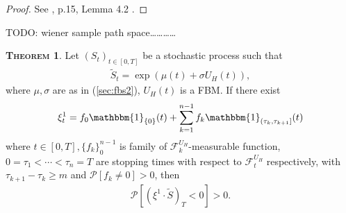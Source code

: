 \documentclass[a4paper, twoside, 11pt]{article}
\theoremstyle{definition}
\newtheorem{theorem}[definition]{\scshape Theorem}
\newcommand{\brkt}[1]{\left({#1} \right)}
\begin{document}
\begin{proof}
  See \cite{chridito}, p.15, Lemma 4.2 .
\end{proof}
TODO: wiener sample path space\dots\dots\dots\dots
\begin{theorem}
  Let $(S_t)_{t\in[0, T]}$ be a stochastic process such that
  \begin{eqnarray}
	\tilde{S}_t = \exp\brkt{\mu(t) + \sigma U_H(t)},
	\label{sec:fbs}
  \end{eqnarray}
  where $\mu, \sigma$ are as in (\ref{sec:fbs2}), $U_H(t)$ is a FBM. If there exist
  \begin{eqnarray*}
  \xi^1_t = f_0\mathbbm{1}_{\{0\}}(t)+\sum_{k=1}^{n-1} f_k \mathbbm{1}_{(\tau_k, \tau_{k+1}]}(t)
  \end{eqnarray*}
  where $t\in[0, T], \{f_k\}_0^{n-1}$ is family of  $\mathcal{F}^{U_H}_k $-measurable function, $0 = \tau_1 < \cdots <\tau_n = T$ are stopping times with respect to $\mathcal{F}^{U_H}_t $ respectively,  with $\tau_{k+1} - \tau_k\ge m$ and $\mathcal{P}[f_k\neq 0]>0$, then
  \begin{eqnarray*}
	\mathcal{P}[(\xi^1 \cdot \tilde{S})_T < 0] > 0.
	\label{sec:claim}
  \end{eqnarray*}
\end{theorem}
\end{document}
